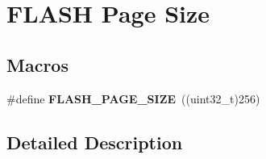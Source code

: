 \hypertarget{group___f_l_a_s_h___page___size}{\section{F\-L\-A\-S\-H Page Size}
\label{group___f_l_a_s_h___page___size}
}
\subsection*{Macros}
\begin{DoxyCompactItemize}
\item 
\hypertarget{group___f_l_a_s_h___page___size_ga4cc14e2c99ae7f8e5a8e371d03c8532c}{\#define {\bfseries F\-L\-A\-S\-H\-\_\-\-P\-A\-G\-E\-\_\-\-S\-I\-Z\-E}~((uint32\-\_\-t)256)}\label{group___f_l_a_s_h___page___size_ga4cc14e2c99ae7f8e5a8e371d03c8532c}

\end{DoxyCompactItemize}


\subsection{Detailed Description}
